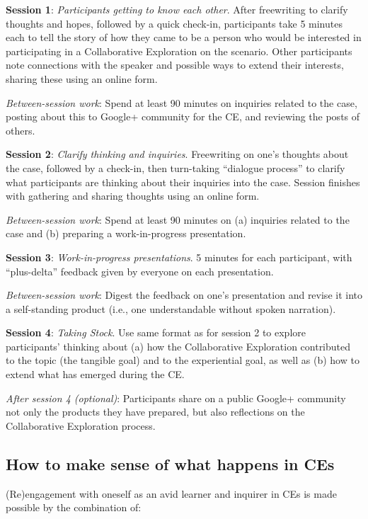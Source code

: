 \textbf{Session 1}: \emph{Participants getting to know each other}.
After freewriting to clarify thoughts and hopes, followed by a quick
check-in, participants take 5 minutes each to tell the story of how they
came to be a person who would be interested in participating in a
Collaborative Exploration on the scenario. Other participants note
connections with the speaker and possible ways to extend their
interests, sharing these using an online form.

\emph{Between-session work}: Spend at least 90 minutes on inquiries
related to the case, posting about this to Google+ community for the CE,
and reviewing the posts of others.

\textbf{Session 2}: \emph{Clarify thinking and inquiries}. Freewriting
on one's thoughts about the case, followed by a check-in, then
turn-taking ``dialogue process'' to clarify what participants are
thinking about their inquiries into the case. Session finishes with
gathering and sharing thoughts using an online form.

\emph{Between-session work}: Spend at least 90 minutes on (a) inquiries
related to the case and (b) preparing a work-in-progress presentation.

\textbf{Session 3}: \emph{Work-in-progress presentations}. 5 minutes for
each participant, with ``plus-delta'' feedback given by everyone on each
presentation.

\emph{Between-session work}: Digest the feedback on one's presentation
and revise it into a self-standing product (i.e., one understandable
without spoken narration).

\textbf{Session 4}: \emph{Taking Stock}. Use same format as for session
2 to explore participants' thinking about (a) how the Collaborative
Exploration contributed to the topic (the tangible goal) and to the
experiential goal, as well as (b) how to extend what has emerged during
the CE.

\emph{After session 4 (optional)}: Participants share on a public
Google+ community not only the products they have prepared, but also
reflections on the Collaborative Exploration process.

\subsection{How to make sense of what happens in
CEs}\label{how-to-make-sense-of-what-happens-in-ces}

(Re)engagement with oneself as an avid learner and inquirer in CEs is
made possible by the combination of:

